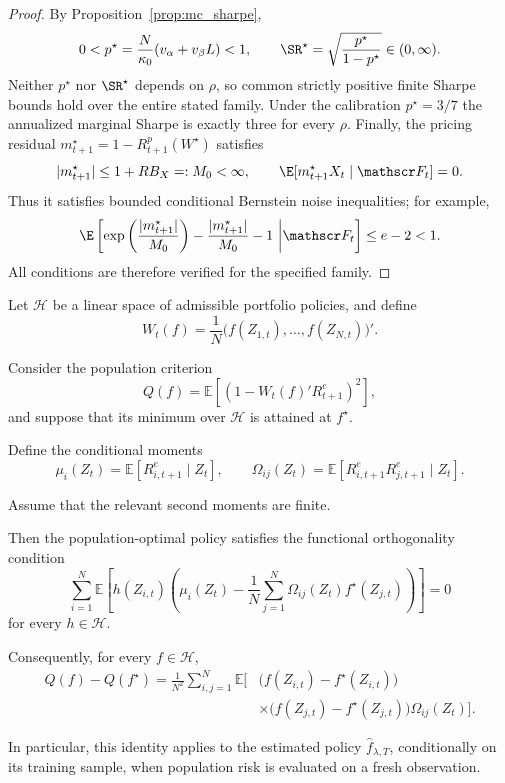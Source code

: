 \begin{proof}
By Proposition~\ref{prop:mc_sharpe},
\[
0<p^\star=\frac{N}{\kappa_0}(v_\alpha+v_\beta L)<1,
\qquad\SR^\star=\sqrt{\frac{p^\star}{1-p^\star}}\in(0,\infty).
\]
Neither $p^\star$ nor $\SR^\star$ depends on $\rho$, so common
strictly positive finite Sharpe bounds hold over the entire stated
family. Under the calibration $p^\star=3/7$ the annualized marginal
Sharpe is exactly three for every $\rho$.
Finally, the pricing residual $m^\star_{t+1}=1-R^p_{t+1}(W^\star)$
satisfies
\[
|m^\star_{t+1}|\leq1+RB_X=:M_0<\infty,
\qquad\E[m^\star_{t+1}X_t\mid\mathscr F_t]=0.
\]
Thus it satisfies bounded conditional Bernstein noise inequalities;
for example,
\[
\E\left[\exp\left(\frac{|m^\star_{t+1}|}{M_0}\right)
-\frac{|m^\star_{t+1}|}{M_0}-1\ \middle|\mathscr F_t\right]
\leq e-2<1.
\]
All conditions are therefore verified for the specified family.
\end{proof}



\begin{proposition}
\label{prop:portfolio_regret}

Let $\mathcal H$ be a linear space of admissible portfolio
policies, and define
\[
W_t(f)
=
\frac{1}{N}
\bigl(f(Z_{1,t}),\ldots,f(Z_{N,t})\bigr)'.
\]

Consider the population criterion
\[
Q(f)
=
\mathbb E\left[
\left(1-W_t(f)'R^e_{t+1}\right)^2
\right],
\]
and suppose that its minimum over $\mathcal H$ is attained at
$f^\star$.

Define the conditional moments
\[
\mu_i(Z_t)
=
\mathbb E[R^e_{i,t+1}\mid Z_t],
\qquad
\Omega_{ij}(Z_t)
=
\mathbb E[R^e_{i,t+1}R^e_{j,t+1}\mid Z_t].
\]

Assume that the relevant second moments are finite.

Then the population-optimal policy satisfies the
functional orthogonality condition
\begin{equation}
\boxed{
\sum_{i=1}^{N}
\mathbb E\left[
h(Z_{i,t})
\left(
\mu_i(Z_t)
-
\frac{1}{N}
\sum_{j=1}^{N}
\Omega_{ij}(Z_t)f^\star(Z_{j,t})
\right)
\right]
=0
}
\label{eq:functional_orthogonality}
\end{equation}
for every $h\in\mathcal H$.

Consequently, for every $f\in\mathcal H$,
\begin{equation}
\boxed{
\begin{aligned}
Q(f)-Q(f^\star)
=
\frac{1}{N^2}
\sum_{i,j=1}^{N}
\mathbb E\Big[
&\bigl(f(Z_{i,t})-f^\star(Z_{i,t})\bigr)\\
&\times
\bigl(f(Z_{j,t})-f^\star(Z_{j,t})\bigr)
\Omega_{ij}(Z_t)
\Big].
\end{aligned}
}
\label{eq:exact_portfolio_regret}
\end{equation}

In particular, this identity applies to the estimated policy
$\widehat f_{\lambda,T}$, conditionally on its training sample,
when population risk is evaluated on a fresh observation.
\end{proposition}


